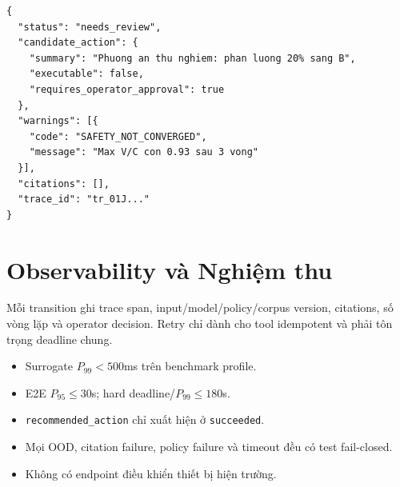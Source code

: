 \begin{lstlisting}[caption={Kết quả cần review},label={lst:review_result}]
{
  "status": "needs_review",
  "candidate_action": {
    "summary": "Phuong an thu nghiem: phan luong 20% sang B",
    "executable": false,
    "requires_operator_approval": true
  },
  "warnings": [{
    "code": "SAFETY_NOT_CONVERGED",
    "message": "Max V/C con 0.93 sau 3 vong"
  }],
  "citations": [],
  "trace_id": "tr_01J..."
}
\end{lstlisting}

\section{Observability và Nghiệm thu}

Mỗi transition ghi trace span, input/model/policy/corpus version, citations, số vòng lặp và operator decision. Retry chỉ dành cho tool idempotent và phải tôn trọng deadline chung.

\begin{itemize}
  \item Surrogate $P_{99}<500$ms trên benchmark profile.
  \item E2E $P_{95}\leq30$s; hard deadline/$P_{99}\leq180$s.
  \item \texttt{recommended\_action} chỉ xuất hiện ở \texttt{succeeded}.
  \item Mọi OOD, citation failure, policy failure và timeout đều có test fail-closed.
  \item Không có endpoint điều khiển thiết bị hiện trường.
\end{itemize}
